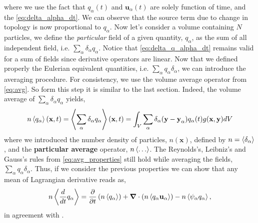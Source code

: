where we use the fact that $q_\alpha(t)$ and $\textbf{u}_\alpha(t)$ are solely function of time, and the \ref{eq:delta_alpha_dt}.
We can observe that the source term due to change in topology is now proportional to $q_\alpha$. 
Now let's consider a volume containing $N$ particles, we define the \textit{particular} field of a given quantity, $q_\alpha$, as the sum of all independent field, i.e. $\sum_\alpha \delta_\alpha q_\alpha$.
Notice that \ref{eq:delta_q_alpha_dt} remains valid for a sum of fields since derivative operators are linear.  
Now that we defined properly the Eulerian equivalent quantities, i.e. $\sum_\alpha q_\alpha \delta_\alpha$, we can introduce the averaging procedure. 
For consistency, we use the volume average operator from \ref{eq:avg}.
So form this step it is similar to the last section. 
Indeed, the volume average of $\sum_\alpha \delta_\alpha q_\alpha$ yields, 
\begin{equation*}
    n \left<q_\alpha\right>(\textbf{x},t)
    = \left<\sum_\alpha\delta_\alpha q_\alpha\right> (\textbf{x},t)
    = \int_V 
    \sum_\alpha \delta_\alpha(\textbf{y}- \textbf{y}_\alpha) q_\alpha(t)  
    g(\textbf{x},\textbf{y}) 
    dV
    \label{eq:avg_p}
\end{equation*}
where we introduced the number density of particles, $n(\textbf{x})$, defined by $n = \left<\delta_\alpha\right>$, and the \textbf{particular average} operator, $n \left<\ldots\right>$.  
The Reynolds’s, Leibniz's and Gauss's rules from \ref{eq:avg_properties} still hold while averaging the fields, $\sum_\alpha q_\alpha \delta_\alpha$.
Thus, if we consider the previous properties we can show that any mean of Lagrangian derivative reads as, 
\begin{equation}
    n \left<\frac{d}{d t} q_\alpha\right>
    = \frac{\partial}{\partial t} \left(n \left<q_\alpha\right>\right)
    + \bm{\nabla} \cdot \left(n \left<q_\alpha \textbf{u}_\alpha\right>\right)
    - n \left<\psi_\alpha q_\alpha\right>
    ,\label{eq:q_alpha_dt_avg}
\end{equation}
in agreement with \citep{anderson1967fluid}.

